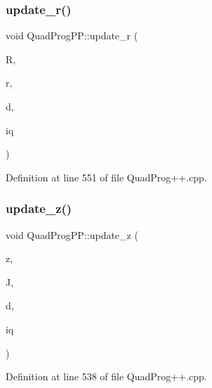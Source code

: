 \subsubsection{\texorpdfstring{update\+\_\+r()}{update\_r()}}
{\footnotesize\ttfamily void Quad\+Prog\+P\+P\+::update\+\_\+r (\begin{DoxyParamCaption}\item[{const Eigen\+::\+Matrix\+Xd \&}]{R,  }\item[{Eigen\+::\+Vector\+Xd \&}]{r,  }\item[{const Eigen\+::\+Vector\+Xd \&}]{d,  }\item[{int}]{iq }\end{DoxyParamCaption})\hspace{0.3cm}{\ttfamily [inline]}}



Definition at line 551 of file Quad\+Prog++.\+cpp.

\hypertarget{namespaceQuadProgPP_ad1f10b211fb5b81828c9a8bb252ba732}{}\label{namespaceQuadProgPP_ad1f10b211fb5b81828c9a8bb252ba732} 
\subsubsection{\texorpdfstring{update\+\_\+z()}{update\_z()}}
{\footnotesize\ttfamily void Quad\+Prog\+P\+P\+::update\+\_\+z (\begin{DoxyParamCaption}\item[{Eigen\+::\+Vector\+Xd \&}]{z,  }\item[{const Eigen\+::\+Matrix\+Xd \&}]{J,  }\item[{const Eigen\+::\+Vector\+Xd \&}]{d,  }\item[{int}]{iq }\end{DoxyParamCaption})\hspace{0.3cm}{\ttfamily [inline]}}



Definition at line 538 of file Quad\+Prog++.\+cpp.

